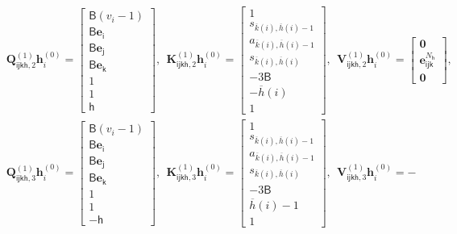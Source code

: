 \documentclass[10pt]{article}
\renewcommand{\bar}{\overline}
\newcommand{\<}{\left\langle}
\renewcommand{\>}{\right\rangle}
\renewcommand{\bQ}{\mathbf{Q}}
\newcommand{\bzero}{{\mathbf 0}}
\newcommand{\state}{{s}}
\newcommand{\action}{{a}}
\newcommand{\tfthres}{{\mathsf{B}}}
\newcommand{\Numvi}{{N}}
\newcommand{\oddeven}{{v}}
\def\bK{{\mathbf K}}
\def\bQ{{\mathbf Q}}
\def\bV{{\mathbf V}}
\def\be{{\mathbf e}}
\def\bh{{\mathbf h}}
\def\si{{\mathsf{i}}}
\def\sj{{\mathsf{j}}}
\def\sk{{\mathsf{k}}}
\def\sh{{\mathsf{h}}}
\begin{document}
\begin{align*}
&\bQ^{(1)}_{\si\sj\sk\sh,2}\bh^{(0)}_{i}=
\begin{bmatrix}
\tfthres(\oddeven_i-1)\\
        \tfthres\be_\si\\
         \tfthres\be_\sj\\
          \tfthres\be_\sk\\
          1\\
          1\\
         \sh
    \end{bmatrix},~~ \bK^{(1)}_{\si\sj\sk\sh,2}\bh^{(0)}_{i}=\begin{bmatrix}1\\
     \state_{\bar{k}(i),\bar{h}(i)-1}\\
        \action_{\bar{k}(i),\bar{h}(i)-1}\\
         \state_{\bar{k}(i),\bar{h}(i)}\\
        -3\tfthres\\
     - \bar{h}(i)\\
        1
\end{bmatrix},~~ \bV^{(1)}_{\si\sj\sk\sh,2}\bh^{(0)}_{i}=
\begin{bmatrix}
\bzero\\\be^{\Numvi_\sh}_{\si\sj\sk}
\\\bzero\end{bmatrix},
\\
&\bQ^{(1)}_{\si\sj\sk\sh,3}\bh^{(0)}_{i}=
\begin{bmatrix}
\tfthres(\oddeven_i-1)\\
        \tfthres\be_\si\\
         \tfthres\be_\sj\\
          \tfthres\be_\sk\\
          1\\
          1\\
         -\sh
    \end{bmatrix},~~ \bK^{(1)}_{\si\sj\sk\sh,3}\bh^{(0)}_{i}=\begin{bmatrix}1\\
     \state_{\bar{k}(i),\bar{h}(i)-1}\\
        \action_{\bar{k}(i),\bar{h}(i)-1}\\
         \state_{\bar{k}(i),\bar{h}(i)}\\
        -3\tfthres\\
      \bar{h}(i)-1\\
        1
\end{bmatrix},~~ \bV^{(1)}_{\si\sj\sk\sh,3}\bh^{(0)}_{i}=-

\end{align*}
\end{document}
